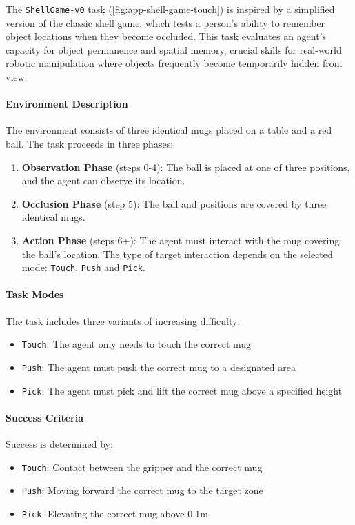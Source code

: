 The \texttt{ShellGame-v0} task (\autoref{fig:app-shell-game-touch}) is inspired by a simplified version of the classic shell game, which tests a person's ability to remember object locations when they become occluded. This task evaluates an agent's capacity for object permanence and spatial memory, crucial skills for real-world robotic manipulation where objects frequently become temporarily hidden from view.

\paragraph{Environment Description} The environment consists of three identical mugs placed on a table and a red ball. The task proceeds in three phases:
\begin{enumerate}
    \item \textbf{Observation Phase} (steps 0-4): The ball is placed at one of three positions, and the agent can observe its location.
    \item \textbf{Occlusion Phase} (step 5): The ball and positions are covered by three identical mugs.
    \item \textbf{Action Phase} (steps 6+): The agent must interact with the mug covering the ball's location. The type of target interaction depends on the selected mode: \texttt{Touch}, \texttt{Push} and \texttt{Pick}.
\end{enumerate}

\paragraph{Task Modes} The task includes three variants of increasing difficulty:
\begin{itemize}
    \item \texttt{Touch}: The agent only needs to touch the correct mug
    \item \texttt{Push}: The agent must push the correct mug to a designated area
    \item \texttt{Pick}: The agent must pick and lift the correct mug above a specified height
\end{itemize}

\paragraph{Success Criteria} Success is determined by:
\begin{itemize}
    \item \texttt{Touch}: Contact between the gripper and the correct mug
    \item \texttt{Push}: Moving forward the correct mug to the target zone
    \item \texttt{Pick}: Elevating the correct mug above 0.1m
\end{itemize}

